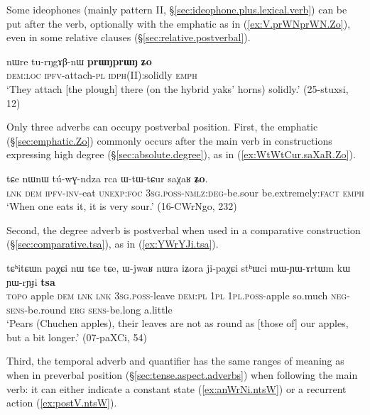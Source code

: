 Some ideophones (mainly pattern II, §\ref{sec:ideophone.plus.lexical.verb}) can be put after the verb, optionally with  the emphatic  as in (\ref{ex:V.prWNprWN.Zo}), even in some relative clauses (§\ref{sec:relative.postverbal}).

\begin{exe}
\ex \label{ex:V.prWNprWN.Zo}
\gll nɯre tu-rŋgɤβ-nɯ \textbf{prɯŋprɯŋ} \textbf{ʑo} \\
\textsc{dem}:\textsc{loc} \textsc{ipfv}-attach-\textsc{pl} \textsc{idph}(II):solidly \textsc{emph} \\
\glt `They attach [the plough] there (on the hybrid yaks' horns) solidly.' (25-stuxsi, 12)
\end{exe}

Only three adverbs can occupy postverbal position. First, the emphatic  (§\ref{sec:emphatic.Zo}) commonly occurs after the main verb in constructions expressing high degree (§\ref{sec:absolute.degree}), as in (\ref{ex:WtWtCur.saXaR.Zo}).

\begin{exe}
\ex \label{ex:WtWtCur.saXaR.Zo}
\gll  tɕe nɯnɯ tú-wɣ-ndza rca ɯ-tɯ-tɕur saχaʁ \textbf{ʑo}. \\
\textsc{lnk} \textsc{dem} \textsc{ipfv}-\textsc{inv}-eat \textsc{unexp}:\textsc{foc} \textsc{3sg}.\textsc{poss}-\textsc{nmlz}:\textsc{deg}-be.sour be.extremely:\textsc{fact} \textsc{emph} \\
\glt `When one eats it, it is very sour.' (16-CWrNgo, 232)
\end{exe}

Second, the degree adverb  is postverbal when used in a comparative construction (§\ref{sec:comparative.tsa}), as in (\ref{ex:YWrYJi.tsa}).

\begin{exe}
\ex \label{ex:YWrYJi.tsa}
\gll tɕʰitɕɯn paχɕi nɯ tɕe tɕe, ɯ-jwaʁ nɯra iʑora ji-paχɕi stʰɯci mɯ-ɲɯ-ɤrtɯm kɯ ɲɯ-rɲɟi \textbf{tsa} \\
\textsc{topo} apple \textsc{dem} \textsc{lnk} \textsc{lnk} \textsc{3sg}.\textsc{poss}-leave \textsc{dem}:\textsc{pl} \textsc{1pl} \textsc{1pl}.\textsc{poss}-apple so.much \textsc{neg}-\textsc{sens}-be.round \textsc{erg} \textsc{sens}-be.long a.little \\
\glt `Pears (Chuchen apples), their leaves are not as round as [those of] our apples, but a bit longer.' (07-paXCi, 54)
\end{exe}

Third, the temporal adverb and quantifier  has the same ranges of meaning as when in preverbal position (§\ref{sec:tense.aspect.adverbs})  when following the main verb: it can either indicate a constant state (\ref{ex:anWrNi.ntsW}) or a recurrent action (\ref{ex:postV.ntsW}).

